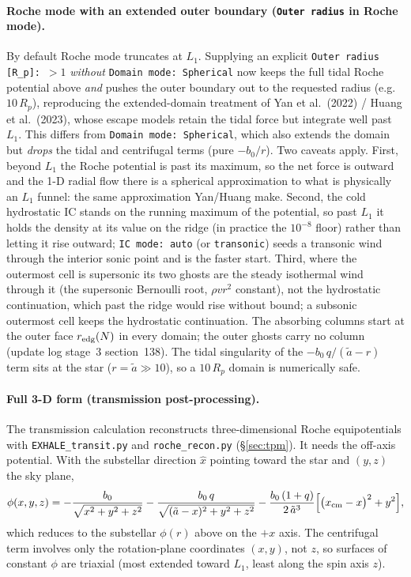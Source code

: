 \documentclass[english,a4paper]{my_memo}
\begin{document}
\paragraph{Roche mode with an extended outer boundary (\texttt{Outer radius} in
Roche mode).}
By default Roche mode truncates at $L_1$. Supplying an explicit
\texttt{Outer radius [R\_p]:}~$>1$ \emph{without} \texttt{Domain mode: Spherical}
now keeps the full tidal Roche potential above \emph{and} pushes the outer
boundary out to the requested radius (e.g.\ $10\,R_p$), reproducing the
extended-domain treatment of Yan et al.\ (2022) / Huang et al.\ (2023), whose
escape models retain the tidal force but integrate well past $L_1$. This differs
from \texttt{Domain mode: Spherical}, which also extends the domain but
\emph{drops} the tidal and centrifugal terms (pure $-b_0/r$). Two caveats apply.
First, beyond $L_1$ the Roche potential is past its maximum, so the net force is
outward and the 1-D radial flow there is a spherical approximation to what is
physically an $L_1$ funnel: the same approximation Yan/Huang make. Second, the
cold hydrostatic IC stands on the running maximum of the potential, so past
$L_1$ it holds the density at its value on the ridge (in practice the
$10^{-8}$ floor) rather than letting it rise outward; \texttt{IC mode: auto}
(or \texttt{transonic}) seeds a transonic wind through the interior sonic
point and is the faster start. Third, where the outermost cell is
supersonic its two ghosts are the steady isothermal wind through it (the
supersonic Bernoulli root, $\rho v r^2$ constant), not the hydrostatic
continuation, which past the ridge would rise without bound; a subsonic
outermost cell keeps the hydrostatic continuation. The absorbing columns
start at the outer face $r_{\rm edg}(N)$ in every domain; the outer ghosts
carry no column (update log stage~3 section~138). The tidal singularity of the $-b_0\,q/(\tilde a-r)$ term sits at the
star ($r=\tilde a\gg10$), so a $10\,R_p$ domain is numerically safe.

\paragraph{Full 3-D form (transmission post-processing).}
The transmission calculation reconstructs three-dimensional Roche
equipotentials with \texttt{EXHALE\_transit.py} and
\texttt{roche\_recon.py} (\S\ref{sec:tpm}). It needs the off-axis potential.
With the substellar direction $\hat x$ pointing toward the star and $(y,z)$ the
sky plane,
\[
\phi(x,y,z) = -\frac{b_0}{\sqrt{x^2+y^2+z^2}}
   - \frac{b_0\,q}{\sqrt{(\tilde a-x)^2+y^2+z^2}}
   - \frac{b_0\,(1+q)}{2\,\tilde a^{3}}
        \Big[\big(x_{\rm cm}-x\big)^2 + y^2\Big],
\]
which reduces to the substellar $\phi(r)$ above on the $+x$ axis. The centrifugal
term involves only the rotation-plane coordinates $(x,y)$, not $z$, so surfaces of
constant $\phi$ are triaxial (most extended toward $L_1$, least along the spin
axis $z$).
\end{document}
